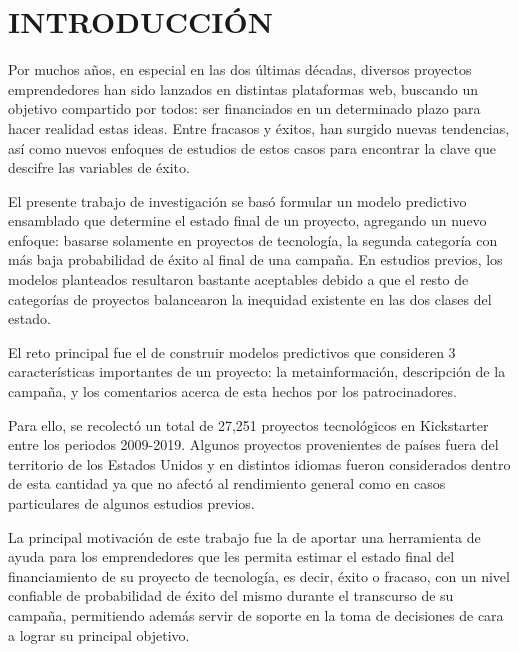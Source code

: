 
\chapter*{INTRODUCCIÓN}

Por muchos años, en especial en las dos últimas décadas, diversos proyectos emprendedores han sido lanzados en distintas plataformas web, buscando un objetivo compartido por todos: ser financiados en un determinado plazo para hacer realidad estas ideas. Entre fracasos y éxitos, han surgido nuevas tendencias, así como nuevos enfoques de estudios de estos casos para encontrar la clave que descifre las variables de éxito.

El presente trabajo de investigación se basó formular un modelo predictivo ensamblado que determine el estado final de un proyecto, agregando un nuevo enfoque: basarse solamente en proyectos de tecnología, la segunda categoría con más baja probabilidad de éxito al final de una campaña. En estudios previos, los modelos planteados resultaron bastante aceptables debido a que el resto de categorías de proyectos balancearon la inequidad existente en las dos clases del estado.

El reto principal fue el de construir modelos predictivos que consideren 3 características importantes de un proyecto: la metainformación, descripción de la campaña, y los comentarios acerca de esta hechos por los patrocinadores.

Para ello, se recolectó un total de 27,251 proyectos tecnológicos en Kickstarter entre los periodos 2009-2019. Algunos proyectos provenientes de países fuera del territorio de los Estados Unidos y en distintos idiomas fueron considerados dentro de esta cantidad ya que no afectó al rendimiento general como en casos particulares de algunos estudios previos.

La principal motivación de este trabajo fue la de aportar una herramienta de ayuda para los emprendedores que les permita estimar el estado final del financiamiento de su proyecto de tecnología, es decir, éxito o fracaso, con un nivel confiable de probabilidad de éxito del mismo durante el transcurso de su campaña, permitiendo además servir de soporte en la toma de decisiones de cara a lograr su principal objetivo.